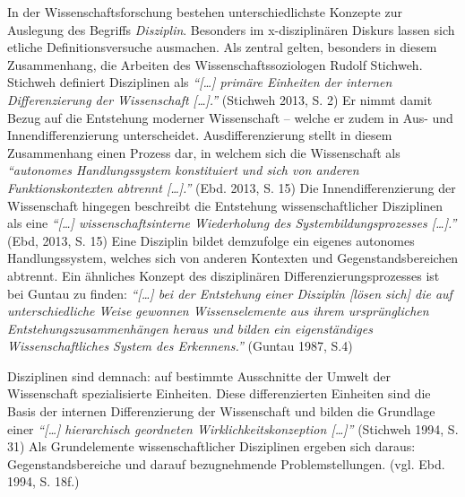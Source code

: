 \documentclass[a4paper,
fontsize=11pt,
oneside,
numbers=noperiodatend,
parskip=half-,
bibliography=totoc,
final
]{scrartcl}
\begin{document}
In der Wissenschaftsforschung bestehen unterschiedlichste Konzepte zur
Auslegung des Begriffs \emph{Disziplin}. Besonders im x-disziplinären
Diskurs lassen sich etliche Definitionsversuche ausmachen. Als zentral
gelten, besonders in diesem Zusammenhang, die Arbeiten des
Wissenschaftssoziologen Rudolf Stichweh. Stichweh definiert Disziplinen
als \emph{\enquote{{[}\ldots{}{]} primäre Einheiten der internen
Differenzierung der Wissenschaft {[}\ldots{}{]}.}} (Stichweh 2013, S. 2)
Er nimmt damit Bezug auf die Entstehung moderner Wissenschaft -- welche
er zudem in Aus- und Innendifferenzierung unterscheidet.
Ausdifferenzierung stellt in diesem Zusammenhang einen Prozess dar, in
welchem sich die Wissenschaft als \emph{\enquote{autonomes
Handlungssystem konstituiert und sich von anderen Funktionskontexten
abtrennt {[}\ldots{}{]}.}} (Ebd. 2013, S. 15) Die Innendifferenzierung
der Wissenschaft hingegen beschreibt die Entstehung wissenschaftlicher
Disziplinen als eine \emph{\enquote{{[}\ldots{}{]} wissenschaftsinterne
Wiederholung des Systembildungsprozesses {[}\ldots{}{]}.}} (Ebd, 2013,
S. 15) Eine Disziplin bildet demzufolge ein eigenes autonomes
Handlungssystem, welches sich von anderen Kontexten und
Gegenstandsbereichen abtrennt. Ein ähnliches Konzept des disziplinären
Differenzierungsprozesses ist bei Guntau zu finden:
\emph{\enquote{{[}\ldots{}{]} bei der Entstehung einer Disziplin
{[}lösen sich{]} die auf unterschiedliche Weise gewonnen Wissenselemente
aus ihrem ursprünglichen Entstehungszusammenhängen heraus und bilden ein
eigenständiges Wissenschaftliches System des Erkennens.}} (Guntau 1987,
S.4)

Disziplinen sind demnach: auf bestimmte Ausschnitte der Umwelt der
Wissenschaft spezialisierte Einheiten. Diese differenzierten Einheiten
sind die Basis der internen Differenzierung der Wissenschaft und bilden
die Grundlage einer \emph{\enquote{{[}\ldots{}{]} hierarchisch
geordneten Wirklichkeitskonzeption {[}\ldots{}{]}}} (Stichweh 1994, S.
31) Als Grundelemente wissenschaftlicher Disziplinen ergeben sich
daraus: Gegenstandsbereiche und darauf bezugnehmende Problemstellungen.
(vgl. Ebd. 1994, S. 18f.)
\end{document}
